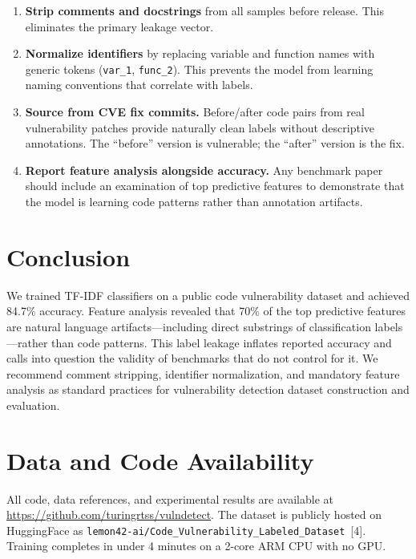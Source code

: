 \documentclass[11pt,a4paper]{article}
\begin{document}
\begin{enumerate}
    \item \textbf{Strip comments and docstrings} from all samples before release. This eliminates the primary leakage vector.
    \item \textbf{Normalize identifiers} by replacing variable and function names with generic tokens (\texttt{var\_1}, \texttt{func\_2}). This prevents the model from learning naming conventions that correlate with labels.
    \item \textbf{Source from CVE fix commits.} Before/after code pairs from real vulnerability patches provide naturally clean labels without descriptive annotations. The ``before'' version is vulnerable; the ``after'' version is the fix.
    \item \textbf{Report feature analysis alongside accuracy.} Any benchmark paper should include an examination of top predictive features to demonstrate that the model is learning code patterns rather than annotation artifacts.
\end{enumerate}

\section{Conclusion}

We trained TF-IDF classifiers on a public code vulnerability dataset and achieved 84.7\% accuracy. Feature analysis revealed that 70\% of the top predictive features are natural language artifacts---including direct substrings of classification labels---rather than code patterns. This label leakage inflates reported accuracy and calls into question the validity of benchmarks that do not control for it. We recommend comment stripping, identifier normalization, and mandatory feature analysis as standard practices for vulnerability detection dataset construction and evaluation.

\section*{Data and Code Availability}

All code, data references, and experimental results are available at \url{https://github.com/turingrtss/vulndetect}. The dataset is publicly hosted on HuggingFace as \texttt{lemon42-ai/Code\_Vulnerability\_Labeled\_Dataset}~[4]. Training completes in under 4 minutes on a 2-core ARM CPU with no GPU.
\end{document}
